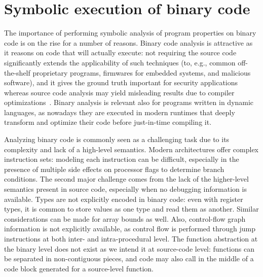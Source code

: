 
\section{Symbolic execution of binary code}
\label{se:symbolic-binary}

The importance of performing symbolic analysis of program properties on binary code is on the rise for a number of reasons. Binary code analysis is attractive as it reasons on code that will actually execute: not requiring the source code significantly extends the applicability of such techniques (to, e.g., common off-the-shelf proprietary programs, firmwares for embedded systems, and malicious software), and it gives the ground truth important for security applications whereas source code analysis may yield misleading results due to compiler optimizations~\cite{BITBLAZE-ICISS08}. %
Binary analysis is relevant also for programs written in dynamic languages, as nowadays they are executed in modern runtimes that deeply transform and optimize their code before just-in-time compiling it.


Analyzing binary code is commonly seen as a challenging task due to its complexity and lack of a high-level semantics. Modern architectures offer complex instruction sets: modeling each instruction can be difficult, especially in the presence of multiple side effects on processor flags to determine branch conditions. The second major challenge comes from the lack of the higher-level semantics present in source code, especially when no debugging information is available. Types are not explicitly encoded in binary code: even with register types, it is common to store values as one type and read them as another. Similar considerations can be made for array bounds as well. Also, control-flow graph information is not explicitly available, as control flow is performed through jump instructions at both inter- and intra-procedural level. The function abstraction at the binary level does not exist as we intend it at source-code level: functions can be separated in non-contiguous pieces, and code may also call in the middle of a code block generated for a source-level function.

